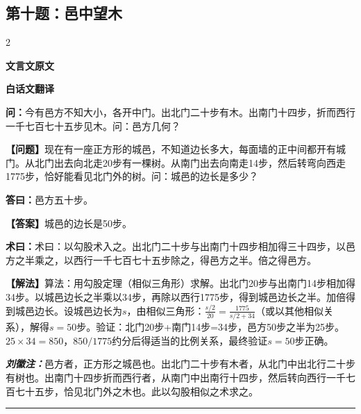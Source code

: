 \documentclass[10pt,a4paper]{article}
\newcommand{\wen}[1]{\textbf{\color{problemcolor}问：}#1\par}
\newcommand{\da}[1]{\textbf{答曰：}#1\par}
\newcommand{\shu}[1]{\textbf{术曰：}#1\par}
\newcommand{\liuhui}[1]{{\color{commentarycolor}\textit{\textbf{刘徽注：}}#1\par}}
\newcommand{\classicalheader}[1]{{\centering\large\bfseries\color{classicalcolor} #1\par\vspace{0.5em}}}
\newcommand{\wenmodern}[1]{\textbf{\color{moderncolor}【问题】}#1\par}
\newcommand{\damodern}[1]{\textbf{【答案】}#1\par}
\newcommand{\shumodern}[1]{\textbf{【解法】}#1\par}
\newcommand{\modernheader}[1]{{\centering\large\bfseries\color{moderncolor} #1\par\vspace{0.5em}}}
\newcommand{\problemsec}[1]{\subsection*{#1}}
\begin{document}
\problemsec{第十题：邑中望木}
\begin{paracol}{2}
\classicalheader{文言文原文}
\switchcolumn
\modernheader{白话文翻译}
\switchcolumn*

\wen{今有邑方不知大小，各开中门。出北门二十步有木。出南门十四步，折而西行一千七百七十五步见木。问：邑方几何？}

\switchcolumn

\wenmodern{现在有一座正方形的城邑，不知道边长多大，每面墙的正中间都开有城门。从北门出去向北走20步有一棵树。从南门出去向南走14步，然后转弯向西走1775步，恰好能看见北门外的树。问：城邑的边长是多少？}

\switchcolumn*

\da{邑方五十步。}

\switchcolumn

\damodern{城邑的边长是50步。}

\switchcolumn*

\shu{术曰：以勾股术入之。出北门二十步与出南门十四步相加得三十四步，以邑方之半乘之，以西行一千七百七十五步除之，得邑方之半。倍之得邑方。}

\switchcolumn

\shumodern{算法：用勾股定理（相似三角形）求解。出北门20步与出南门14步相加得34步。以城邑边长之半乘以34步，再除以西行1775步，得到城邑边长之半。加倍得到城邑边长。设城邑边长为$s$，由相似三角形：$\frac{s/2}{20}=\frac{1775}{s/2+34}$（或以其他相似关系），解得$s=50$步。验证：北门20步+南门14步=34步，邑方50步之半为25步。$25\times34=850$，$850/1775$约分后得适当的比例关系，最终验证$s=50$步正确。}

\switchcolumn*

\liuhui{邑方者，正方形之城邑也。出北门二十步有木者，从北门中出北行二十步有树也。出南门十四步折而西行者，从南门中出南行十四步，然后转向西行一千七百七十五步，恰见北门外之木也。此以勾股相似之术求之。}

\switchcolumn


\end{paracol}

\vspace{0.3cm}
\hrule
\vspace{0.3cm}
\end{document}
